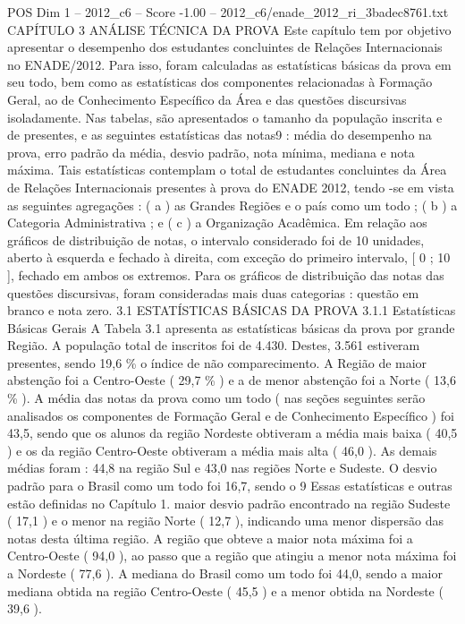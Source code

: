 \begin{textsample}{POS Dim 1 – 2012\_c6 – Score -1.00 – 2012\_c6/enade\_2012\_ri\_3badec8761.txt}  \label{ex:f1_pos_185}
CAPÍTULO 3 ANÁLISE TÉCNICA DA PROVA Este capítulo tem por objetivo apresentar o desempenho dos estudantes concluintes de Relações Internacionais no ENADE/2012.
Para isso, foram calculadas as estatísticas básicas da prova em seu todo, bem como as estatísticas dos componentes relacionadas à Formação Geral, ao de Conhecimento Específico da Área e das questões discursivas isoladamente.
Nas tabelas, são apresentados o tamanho da população inscrita e de presentes, e as seguintes estatísticas das notas9 : média do desempenho na prova, erro padrão da média, desvio padrão, nota mínima, mediana e nota máxima.
Tais estatísticas contemplam o total de estudantes concluintes da Área de Relações Internacionais presentes à prova do ENADE 2012, tendo -se em vista as seguintes agregações : ( a ) as Grandes Regiões e o país como um todo ; ( b ) a Categoria Administrativa ; e ( c ) a Organização Acadêmica.
Em relação aos gráficos de distribuição de notas, o intervalo considerado foi de 10 unidades, aberto à esquerda e fechado à direita, com exceção do primeiro intervalo, [ 0 ; 10 ], fechado em ambos os extremos.
Para os gráficos de distribuição das notas das questões discursivas, foram consideradas mais duas categorias : questão em branco e nota zero. 3.1 ESTATÍSTICAS BÁSICAS DA PROVA 3.1.1 Estatísticas Básicas Gerais A Tabela 3.1 apresenta as estatísticas básicas da prova por grande Região.
A população total de inscritos foi de 4.430.
Destes, 3.561 estiveram presentes, sendo 19,6 \% o índice de não comparecimento.
A Região de maior abstenção foi a Centro-Oeste ( 29,7 \% ) e a de menor abstenção foi a Norte ( 13,6 \% ).
A média das notas da prova como um todo ( nas seções seguintes serão analisados os componentes de Formação Geral e de Conhecimento Específico ) foi 43,5, sendo que os alunos da região Nordeste obtiveram a média mais baixa ( 40,5 ) e os da região Centro-Oeste obtiveram a média mais alta ( 46,0 ).
As demais médias foram : 44,8 na região Sul e 43,0 nas regiões Norte e Sudeste.
O desvio padrão para o Brasil como um todo foi 16,7, sendo o 9 Essas estatísticas e outras estão definidas no Capítulo 1. maior desvio padrão encontrado na região Sudeste ( 17,1 ) e o menor na região Norte ( 12,7 ), indicando uma menor dispersão das notas desta última região.
A região que obteve a maior nota máxima foi a Centro-Oeste ( 94,0 ), ao passo que a região que atingiu a menor nota máxima foi a Nordeste ( 77,6 ).
A mediana do Brasil como um todo foi 44,0, sendo a maior mediana obtida na região Centro-Oeste ( 45,5 ) e a menor obtida na Nordeste ( 39,6 ).

\end{textsample}
